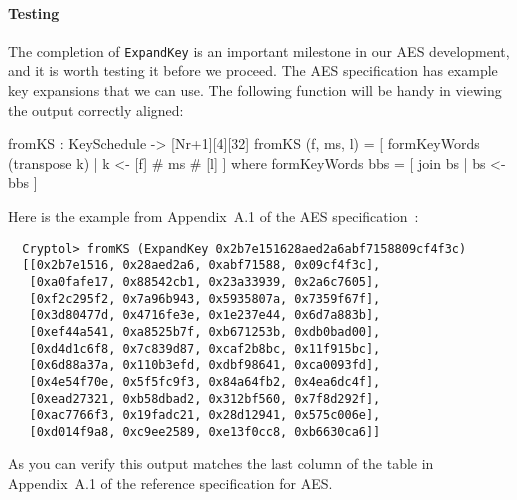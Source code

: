 \paragraph*{Testing {}} The completion of
{\tt ExpandKey} is an important milestone in our AES\indAES
development, and it is worth testing it before we proceed. The AES
specification has example key expansions that we can use. The
following function will be handy in viewing the output correctly
aligned:
\begin{code}
  fromKS : KeySchedule -> [Nr+1][4][32]
  fromKS (f, ms, l) = [ formKeyWords (transpose k) 
                      | k <- [f] # ms # [l] 
                      ]
         where formKeyWords bbs = [ join bs | bs <- bbs ]
\end{code}
Here is the example from Appendix~A.1 of the AES\indAES
specification~\cite{aes}:
\begin{Verbatim}
  Cryptol> fromKS (ExpandKey 0x2b7e151628aed2a6abf7158809cf4f3c)
  [[0x2b7e1516, 0x28aed2a6, 0xabf71588, 0x09cf4f3c],
   [0xa0fafe17, 0x88542cb1, 0x23a33939, 0x2a6c7605],
   [0xf2c295f2, 0x7a96b943, 0x5935807a, 0x7359f67f],
   [0x3d80477d, 0x4716fe3e, 0x1e237e44, 0x6d7a883b],
   [0xef44a541, 0xa8525b7f, 0xb671253b, 0xdb0bad00],
   [0xd4d1c6f8, 0x7c839d87, 0xcaf2b8bc, 0x11f915bc],
   [0x6d88a37a, 0x110b3efd, 0xdbf98641, 0xca0093fd],
   [0x4e54f70e, 0x5f5fc9f3, 0x84a64fb2, 0x4ea6dc4f],
   [0xead27321, 0xb58dbad2, 0x312bf560, 0x7f8d292f],
   [0xac7766f3, 0x19fadc21, 0x28d12941, 0x575c006e],
   [0xd014f9a8, 0xc9ee2589, 0xe13f0cc8, 0xb6630ca6]]
\end{Verbatim}
As you can verify this output matches the last column of the table in
Appendix~A.1 of the reference specification for AES.\indAES

